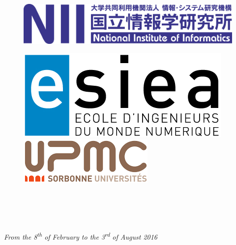 \begin{titlepage}


\begin{center}

\begin{figure}[!h]
  \includegraphics[width=0.5\linewidth]{images/logo_NII.png}
\end{figure}

\begin{figure}[!h]
  \begin{floatrow}
    \includegraphics[width=0.30\linewidth]{images/logo_ESIEA.png}
    \hspace{4cm}
    \includegraphics[width=0.34\linewidth]{images/logo_UPMC.png}
  \end{floatrow}
\end{figure}

\vspace{1.5cm}

\textsc{\Large \reportsubject} \\[0.5cm]
\HRule \\[0.5cm]
{\huge \reporttitle} \\[0.5cm]
\HRule \\[0.5cm]

\textit{From the 8\textsuperscript{th} of February to the 3\textsuperscript{rd} of August 2016}

\vspace{4.5cm}


\end{center}
\end{titlepage}

